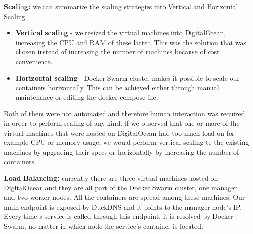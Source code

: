 \textbf{Scaling:} we can summarize the scaling strategies into Vertical and Horizontal Scaling. 
\begin{itemize}
    \item \textbf{Vertical scaling} - we resized the virtual machines into DigitalOcean, increasing the CPU and RAM of these latter. This was the solution that was chosen instead of increasing the number of machines because of cost convenience.
    \item \textbf{Horizontal scaling} -  Docker Swarm cluster makes it possible to scale our containers horizontally. This can be achieved either through manual maintenance or editing the docker-compose file.
\end{itemize}

Both of them were not automated and therefore human interaction was required in order to perform scaling of any kind. If we observed that one or more of the virtual machines that were hosted on DigitalOcean had too much load on for example CPU or memory usage, we would perform vertical scaling to the existing machines by upgrading their specs or horizontally by increasing the number of containers.

\textbf{Load Balancing: }currently there are three virtual machines hosted on DigitalOcean and they are all part of the Docker Swarm cluster, one manager and two worker nodes. All the containers are spread among these machines. Our main endpoint is exposed by DuckDNS and it points to the manager node's IP. Every time a service is called through this endpoint, it is resolved by Docker Swarm, no matter in which node the service's container is located.

